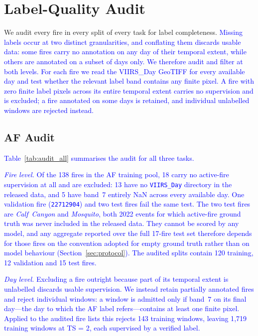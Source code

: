 \documentclass[sensors,article,submit,moreauthors,pdftex]{Definitions/mdpi}
\newcommand{\rev}[1]{\textcolor{blue}{#1}}
\begin{document}
\section{Label-Quality Audit}
\label{sec:audit}

We audit every fire in every split of every task for label completeness. \rev{Missing labels occur at two distinct granularities, and conflating them discards usable data: some fires carry no annotation on any day of their temporal extent, while others are annotated on a subset of days only. We therefore audit and filter at both levels. For each fire we read the VIIRS\_Day GeoTIFF for every available day and test whether the relevant label band contains any finite pixel. A fire with zero finite label pixels across its entire temporal extent carries no supervision and is excluded; a fire annotated on some days is retained, and individual unlabelled windows are rejected instead.}

\subsection{AF Audit}

\rev{Table~\ref{tab:audit_all} summarises the audit for all three tasks.}

\rev{\textit{Fire level.} Of the 138 fires in the AF training pool, 18 carry no
active-fire supervision at all and are excluded: 13 have no \texttt{VIIRS\_Day}
directory in the released data, and 5 have band~7 entirely NaN across every
available day. One validation fire (\texttt{22712904}) and two test fires fail
the same test. The two test fires are
\textit{Calf~Canyon} and \textit{Mosquito}, both 2022 events for which
active-fire ground truth was never included in the released data. They cannot be
scored by any model, and any aggregate reported over the full 17-fire test set
therefore depends for those fires on the convention adopted for empty ground
truth rather than on model behaviour (Section~\ref{sec:protocol}). The audited
splits contain 120 training, 12 validation and 15 test fires.}

\rev{\textit{Day level.} Excluding a fire outright because part of its temporal
extent is unlabelled discards usable supervision. We instead retain partially
annotated fires and reject individual windows: a window is admitted only if
band~7 on its final day---the day to which the AF label refers---contains at
least one finite pixel. Applied to the audited fire lists this rejects 143
training windows, leaving 1{,}719 training windows at TS = 2, each supervised by
a verified label.}
\end{document}
